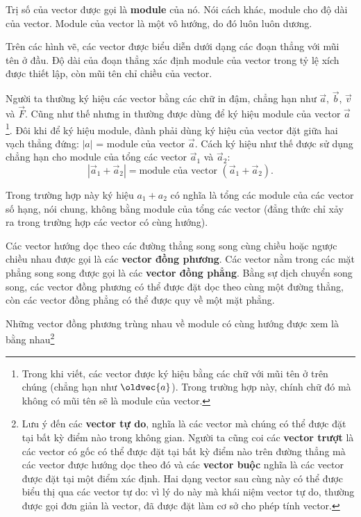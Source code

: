 Trị số của vector được gọi là \textbf{module} của nó. Nói cách khác, module cho độ dài của vector. Module của vector là một vô hướng, do đó luôn luôn dương.

Trên các hình vẽ, các vector được biểu diễn dưới dạng các đoạn thẳng với mũi tên ở đầu. Độ dài của đoạn thẳng xác định module của vector trong tỷ lệ xích được thiết lập, còn mũi tên chỉ chiều của vector.

Người ta thường ký hiệu các vector bằng các chữ in đậm, chẳng hạn như $\vec{a}$, $\vec{b}$, $\vec{v}$ và $\vec{F}$. Cũng như thế nhưng in thường được dùng để ký hiệu module của vector $\vec{a}$\footnote{Trong khi viết, các vector được ký hiệu bằng các chữ với mũi tên ở trên chúng (chẳng hạn như $\oldvec{a}$). Trong trường hợp này, chính chữ đó mà không có mũi tên sẽ là module của vector.}. Đôi khi để ký hiệu module, đành phải dùng ký hiệu của vector đặt giữa hai vạch thẳng đứng: $|a|$ = module của vector $\vec{a}$. Cách ký hiệu như thế được sử dụng chẳng hạn cho module của tổng các vector $\vec{a}_1$ và $\vec{a}_2$:
\begin{equation}\label{eq:1_1}
	|\vec{a}_1 + \vec{a}_2| = \text{module của vector } (\vec{a}_1 + \vec{a}_2).
\end{equation}

\noindent
Trong trường hợp này ký hiệu $a_1+a_2$ có nghĩa là tổng các module của các vector số hạng, nói chung, không bằng module của tổng các vector (đẳng thức chỉ xảy ra trong trường hợp các vector có cùng hướng).

Các vector hướng dọc theo các đường thẳng song song cùng chiều hoặc ngược chiều nhau được gọi là các \textbf{vector đồng phương}. Các vector nằm trong các mặt phẳng song song được gọi là các \textbf{vector đồng phẳng}. Bằng sự dịch chuyển song song, các vector đồng phương có thể được đặt dọc theo cùng một đường thẳng, còn các vector đồng phẳng có thể được quy về một mặt phẳng.

Những vector đồng phương trùng nhau về module có cùng hướng được xem là bằng nhau\footnote{Lưu ý đến các \textbf{vector tự do}, nghĩa là các vector mà chúng có thể được đặt tại bất kỳ điểm nào trong không gian. Người ta cũng coi các \textbf{vector trượt} là các vector có gốc có thể được đặt tại bất kỳ điểm nào trên đường thẳng mà các vector được hướng dọc theo đó và các \textbf{vector buộc} nghĩa là các vector được đặt tại một điểm xác định. Hai dạng vector sau cùng này có thể được biểu thị qua các vector tự do: vì lý do này mà khái niệm vector tự do, thường được gọi đơn giản là vector, đã được đặt làm cơ sở cho phép tính vector.}

